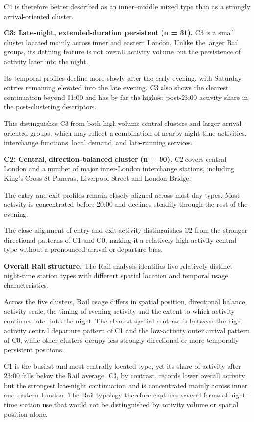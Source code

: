 C4 is therefore better described as an inner--middle mixed type than as a strongly arrival-oriented cluster.

\textbf{C3: Late-night, extended-duration persistent (n = 31).} C3 is a small cluster located mainly across inner and eastern London. Unlike the larger Rail groups, its defining feature is not overall activity volume but the persistence of activity later into the night.

Its temporal profiles decline more slowly after the early evening, with Saturday entries remaining elevated into the late evening. C3 also shows the clearest continuation beyond 01:00 and has by far the highest post-23:00 activity share in the post-clustering descriptors.

This distinguishes C3 from both high-volume central clusters and larger arrival-oriented groups, which may reflect a combination of nearby night-time activities, interchange functions, local demand, and late-running services.

\textbf{C2: Central, direction-balanced cluster (n = 90).} C2 covers central London and a number of major inner-London interchange stations, including King's Cross St Pancras, Liverpool Street and London Bridge.

The entry and exit profiles remain closely aligned across most day types. Most activity is concentrated before 20:00 and declines steadily through the rest of the evening.

The close alignment of entry and exit activity distinguishes C2 from the stronger directional patterns of C1 and C0, making it a relatively high-activity central type without a pronounced arrival or departure bias.

\textbf{Overall Rail structure.} The Rail analysis identifies five relatively distinct night-time station types with different spatial location and temporal usage characteristics.

Across the five clusters, Rail usage differs in spatial position, directional balance, activity scale, the timing of evening activity and the extent to which activity continues later into the night. The clearest spatial contrast is between the high-activity central departure pattern of C1 and the low-activity outer arrival pattern of C0, while other clusters occupy less strongly directional or more temporally persistent positions.

C1 is the busiest and most centrally located type, yet its share of activity after 23:00 falls below the Rail average. C3, by contrast, records lower overall activity but the strongest late-night continuation and is concentrated mainly across inner and eastern London. The Rail typology therefore captures several forms of night-time station use that would not be distinguished by activity volume or spatial position alone.

